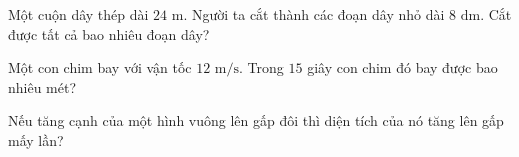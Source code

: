 \begin{ex}
  Một cuộn dây thép dài $24\text{ m}$. Người ta cắt thành các đoạn dây nhỏ dài $8\text{ dm}$. Cắt được tất cả bao nhiêu đoạn dây?
\end{ex}

\begin{ex}
  Một con chim bay với vận tốc $12\text{ m/s}$. Trong $15$ giây con chim đó bay được bao nhiêu mét?
\end{ex}

\begin{ex}
  Nếu tăng cạnh của một hình vuông lên gấp đôi thì diện tích của nó tăng lên gấp mấy lần?
\end{ex}
